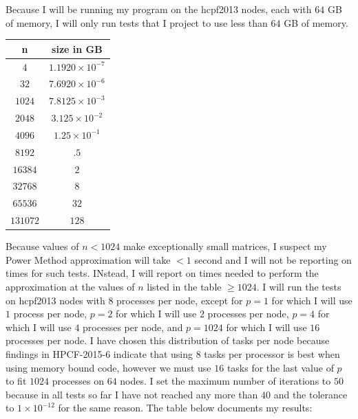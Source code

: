 \documentclass[11pt]{article}
\begin{document}
Because I will be running my program on the hcpf2013 nodes, each with $64$ GB of memory, I will only run tests that I project to use less than $64$ GB of memory.
\begin{center}
\begin{tabular}{ |c|c| } 
\hline
n & size in GB \\
\hline
$4 $& $1.1920 \times 10^{-7} $\\ 
$32$ & $7.6920 \times 10^{-6} $\\
$1024$ & $7.8125 \times 10^{-3} $\\
$2048$ & $3.125 \times 10^{-2} $\\
$4096$ & $1.25 \times 10^{-1} $\\
$8192$ & $ .5 $\\
$16384$ & $ 2 $\\
$32768$ & $  8 $\\
$65536$ & $ 32$\\
$131072$ & $ 128 $\\
\hline
\end{tabular}
\end{center}
Because values of $n<1024$ make exceptionally small matrices, I suspect my Power Method approximation will take $<1$ second and I will not be reporting on times for such tests. INstead, I will report on times needed to perform the approximation at the values of $n$ listed in the table $\geq 1024$. I will run the tests on hcpf2013 nodes with $8$ processes per node, except for $p = 1$ for which I will use $1$ process per node, $p = 2$ for which I will use $2$ processes per node, $p = 4$ for which I will use $4$ processes per node, and $p = 1024$ for which I will use $16$ processes per node. I have chosen this distribution of tasks per node because findings in HPCF-2015-6 indicate that using $8$ tasks per processor is best when using memory bound code, however we must use $16$ tasks for the last value of $p$ to fit $1024$ processes on $64$ nodes. I set the maximum number of iterations to $50$ because in all tests so far I have not reached any more than $40$ and the tolerance to $1 \times 10^{-12}$ for the same reason. The table below documents my results:
\end{document}
